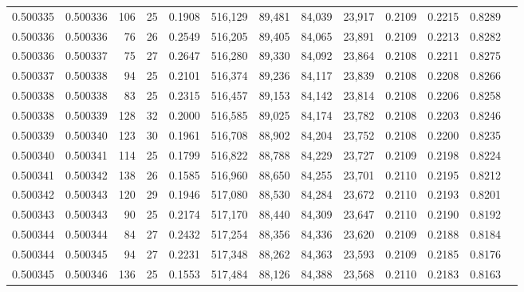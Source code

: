 \begin{tabular}{rrrrrrrrrrrrr}
0.500335 & 0.500336 & 106 &  25 &                                     0.1908 & 516,129 &  89,481 &  84,039 &  23,917 & 0.2109 & 0.2215 & 0.8289 \\
0.500336 & 0.500336 &  76 &  26 &                                     0.2549 & 516,205 &  89,405 &  84,065 &  23,891 & 0.2109 & 0.2213 & 0.8282 \\
0.500336 & 0.500337 &  75 &  27 &                                     0.2647 & 516,280 &  89,330 &  84,092 &  23,864 & 0.2108 & 0.2211 & 0.8275 \\
0.500337 & 0.500338 &  94 &  25 &                                     0.2101 & 516,374 &  89,236 &  84,117 &  23,839 & 0.2108 & 0.2208 & 0.8266 \\
0.500338 & 0.500338 &  83 &  25 &                                     0.2315 & 516,457 &  89,153 &  84,142 &  23,814 & 0.2108 & 0.2206 & 0.8258 \\
0.500338 & 0.500339 & 128 &  32 &                                     0.2000 & 516,585 &  89,025 &  84,174 &  23,782 & 0.2108 & 0.2203 & 0.8246 \\
0.500339 & 0.500340 & 123 &  30 &                                     0.1961 & 516,708 &  88,902 &  84,204 &  23,752 & 0.2108 & 0.2200 & 0.8235 \\
0.500340 & 0.500341 & 114 &  25 &                                     0.1799 & 516,822 &  88,788 &  84,229 &  23,727 & 0.2109 & 0.2198 & 0.8224 \\
0.500341 & 0.500342 & 138 &  26 &                                     0.1585 & 516,960 &  88,650 &  84,255 &  23,701 & 0.2110 & 0.2195 & 0.8212 \\
0.500342 & 0.500343 & 120 &  29 &                                     0.1946 & 517,080 &  88,530 &  84,284 &  23,672 & 0.2110 & 0.2193 & 0.8201 \\
0.500343 & 0.500343 &  90 &  25 &                                     0.2174 & 517,170 &  88,440 &  84,309 &  23,647 & 0.2110 & 0.2190 & 0.8192 \\
0.500344 & 0.500344 &  84 &  27 &                                     0.2432 & 517,254 &  88,356 &  84,336 &  23,620 & 0.2109 & 0.2188 & 0.8184 \\
0.500344 & 0.500345 &  94 &  27 &                                     0.2231 & 517,348 &  88,262 &  84,363 &  23,593 & 0.2109 & 0.2185 & 0.8176 \\
0.500345 & 0.500346 & 136 &  25 &                                     0.1553 & 517,484 &  88,126 &  84,388 &  23,568 & 0.2110 & 0.2183 & 0.8163 \\

\end{tabular}
